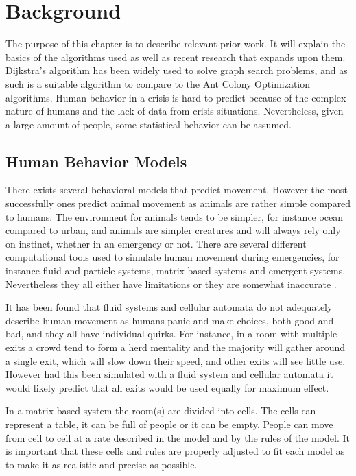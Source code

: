 \chapter{Background}
\label{ch:background}

The purpose of this chapter is to describe relevant prior work. It will explain the basics of the algorithms
used as well as recent research that expands upon them. Dijkstra's algorithm has been widely used to solve
graph search problems, and as such is a suitable algorithm to compare to the Ant Colony Optimization algorithms.
Human behavior in a crisis is hard to predict because of the complex nature of humans and the lack of data from 
crisis situations. Nevertheless, given a large amount of people, some statistical behavior can be assumed.

\section{Human Behavior Models}
There exists several behavioral models that predict movement. However the most successfully ones predict 
animal movement as animals are rather simple compared to humans. The environment for animals tends to 
be simpler, for instance ocean compared to urban, and animals are simpler creatures and will always rely only 
on instinct, whether in an emergency or not. There are several different computational tools used to simulate  
human movement during emergencies, for instance fluid and particle systems, matrix-based systems and  
emergent systems. Nevertheless they all either have limitations or they are somewhat inaccurate \cite{Pan:2007} \cite{6062828}. 
 
It has been found that fluid systems and cellular automata do not adequately describe human movement \cite{Pelechano2008377} as humans  
panic and make choices, both good and bad, and they all have individual quirks. For instance, in a room with  
multiple exits a crowd tend to form a herd mentality and the majority will gather around a single exit, which  
will slow down their speed, and other exits will see little use. However had this been simulated with a fluid system 
and cellular automata it would likely predict that all exits would be used equally for maximum effect. 
 
In a matrix-based system the room(s) are divided into cells. The cells can represent a table, it can be full of  
people or it can be empty. People can move from cell to cell at a rate described in the model and by the  
rules of the model. It is important that these cells and rules are properly adjusted to fit each model as to  
make it as realistic and precise as possible. 
 

